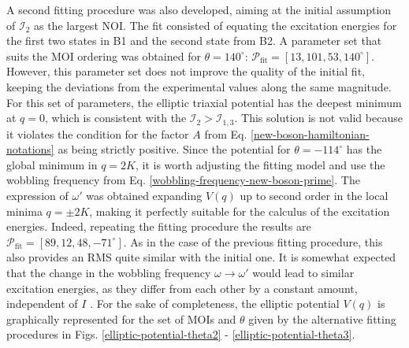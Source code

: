 A second fitting procedure was also developed, aiming at the initial assumption of $\mathcal{I}_2$ as the largest NOI. The fit consisted of equating the excitation energies for the first two states in B1 and the second state from B2. A parameter set that suits the MOI ordering was obtained for $\theta=140^\circ$: $\mathcal{P}_\text{fit}=\left[13,101,53,140^\circ\right]$. However, this parameter set does not improve the quality of the initial fit, keeping the deviations from the experimental values along the same magnitude. For this set of parameters, the elliptic triaxial potential has the deepest minimum at $q=0$, which is consistent with the $\mathcal{I}_2>\mathcal{I}_{1,3}$. This solution is not valid because it violates the condition for the factor $A$ from Eq. \ref{new-boson-hamiltonian-notations} as being strictly positive. Since the potential for $\theta=-114^\circ$ has the global minimum in $q=2K$, it is worth adjusting the fitting model and use the wobbling frequency from Eq. \ref{wobbling-frequency-new-boson-prime}. The expression of $\omega'$ was obtained expanding $V(q)$ up to second order in the local minima $q=\pm 2K$, making it perfectly suitable for the calculus of the excitation energies. Indeed, repeating the fitting procedure the results are $\mathcal{P}_\text{fit}=\left[89,12,48,-71^\circ\right]$. As in the case of the previous fitting procedure, this also provides an RMS quite similar with the initial one. It is somewhat expected that the change in the wobbling frequency $\omega\rightarrow\omega'$ would lead to similar excitation energies, as they differ from each other by a constant amount, independent of $I$ \cite{raduta2020new}. For the sake of completeness, the elliptic potential $V(q)$ is graphically represented for the set of MOIs and $\theta$ given by the alternative fitting procedures in Figs. \ref{elliptic-potential-theta2} - \ref{elliptic-potential-theta3}.
